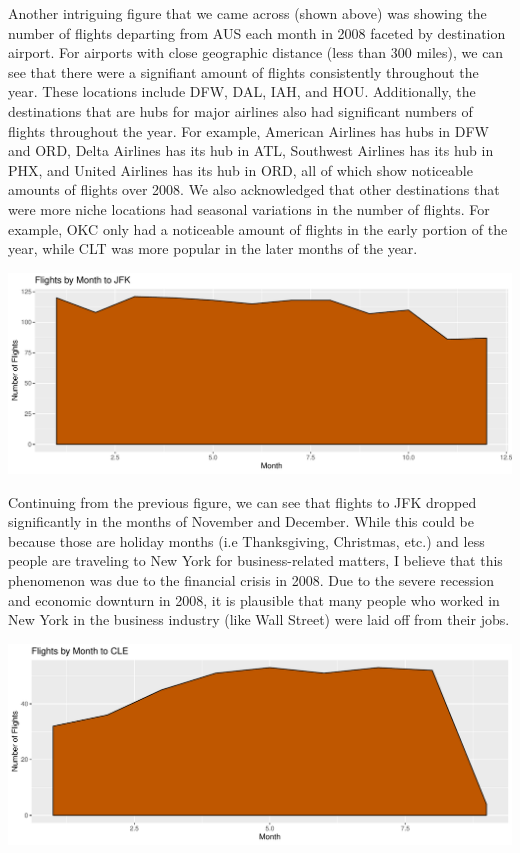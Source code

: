 \documentclass[]{article}
\begin{document}
Another intriguing figure that we came across (shown above) was showing
the number of flights departing from AUS each month in 2008 faceted by
destination airport. For airports with close geographic distance (less
than 300 miles), we can see that there were a signifiant amount of
flights consistently throughout the year. These locations include DFW,
DAL, IAH, and HOU. Additionally, the destinations that are hubs for
major airlines also had significant numbers of flights throughout the
year. For example, American Airlines has hubs in DFW and ORD, Delta
Airlines has its hub in ATL, Southwest Airlines has its hub in PHX, and
United Airlines has its hub in ORD, all of which show noticeable amounts
of flights over 2008. We also acknowledged that other destinations that
were more niche locations had seasonal variations in the number of
flights. For example, OKC only had a noticeable amount of flights in the
early portion of the year, while CLT was more popular in the later
months of the year.

\includegraphics{Report_files/figure-latex/abia5-1.pdf}

Continuing from the previous figure, we can see that flights to JFK
dropped significantly in the months of November and December. While this
could be because those are holiday months (i.e Thanksgiving, Christmas,
etc.) and less people are traveling to New York for business-related
matters, I believe that this phenomenon was due to the financial crisis
in 2008. Due to the severe recession and economic downturn in 2008, it
is plausible that many people who worked in New York in the business
industry (like Wall Street) were laid off from their jobs.\n

\includegraphics{Report_files/figure-latex/abia6-1.pdf}
\end{document}
